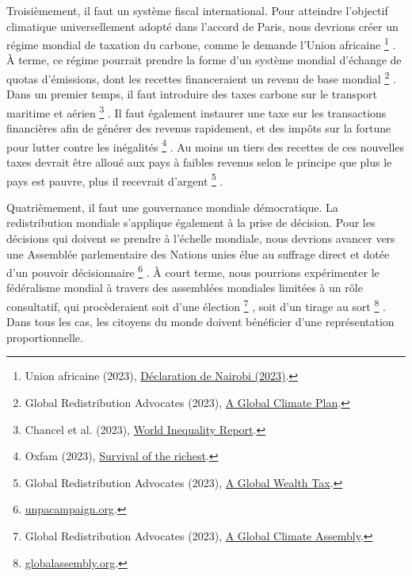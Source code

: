 \documentclass[a5paper,french,openany]{memoir}
\begin{document}
Troisièmement, il faut un système fiscal international. Pour atteindre l'objectif climatique universellement adopté dans l'accord de Paris, nous devrions créer un régime mondial de taxation du carbone, comme le demande l'Union africaine
\footnote{Union africaine (2023), \href{https://media.africaclimatesummit.org/NAIROBI+Declaration+FURTHER+edited+060923+EN+920AM.pdf}{Déclaration de Nairobi (2023)}.}%
.  À terme, ce régime pourrait prendre la forme d'un système mondial d'échange de quotas d'émissions, dont les recettes financeraient un revenu de base mondial
\footnote{Global Redistribution Advocates (2023), \href{https://github.com/bixiou/global\_tax\_attitudes/raw/main/paper/policy\_brief\_GCS.pdf}{A Global Climate Plan}.}%
. Dans un premier temps, il faut introduire des taxes carbone sur le transport maritime et aérien
\footnote{Chancel et al. (2023), \href{https://wid.world/wp-content/uploads/2023/01/CBV2023-ClimateInequalityReport-3.pdf}{World Inequality Report}.}%
. Il faut également instaurer une taxe sur les transactions financières afin de générer des revenus rapidement, et des impôts sur la fortune pour lutter contre les inégalités
\footnote{Oxfam (2023), \href{https://oxfamilibrary.openrepository.com/bitstream/handle/10546/621477/mn-survival-of-the-richest-methodology-160123-en.pdf}{Survival of the richest}.}%
. Au moins un tiers des recettes de ces nouvelles taxes devrait être alloué aux pays à faibles revenus selon le principe que plus le pays est pauvre, plus il recevrait d'argent
\footnote{Global Redistribution Advocates (2023), \href{https://github.com/bixiou/global\_tax\_attitudes/raw/main/paper/policy\_brief\_tax.pdf}{A Global Wealth Tax}.}%
.

Quatrièmement, il faut une gouvernance mondiale démocratique. La redistribution mondiale s'applique également à la prise de décision. Pour les décisions qui doivent se prendre à l'échelle mondiale, nous devrions avancer vers une Assemblée parlementaire des Nations unies élue au suffrage direct et dotée d'un pouvoir décisionnaire
\footnote{\href{https://www.unpacampaign.org/}{unpacampaign.org}.}%
. À court terme, nous pourrions expérimenter le fédéralisme mondial à travers des assemblées mondiales limitées à un rôle consultatif, qui procèderaient soit d'une élection
\footnote{Global Redistribution Advocates (2023), \href{https://github.com/bixiou/global\_tax\_attitudes/raw/main/paper/policy\_brief\_assembly.pdf}{A Global Climate Assembly}.}%
, soit d'un tirage au sort
\footnote{\href{https://globalassembly.org/}{globalassembly.org}.}%
. Dans tous les cas, les citoyens du monde doivent bénéficier d'une représentation proportionnelle.
\end{document}
